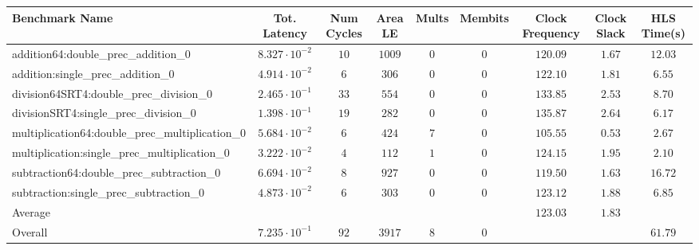 \begin{tabular}{|l|c|c|c|c|c|c|c|c|}
\hline
Benchmark Name                                   & Tot. Latency            & Num Cycles & Area LE  & Mults & Membits & Clock Frequency & Clock Slack & HLS Time(s) \\
\hline
addition64:double\_prec\_addition\_0             & $ 8.327 \cdot 10^{-2} $ & $ 10     $ & $ 1009 $ & $ 0 $ & $ 0   $ & $ 120.09      $ & $ 1.67    $ & $ 12.03   $ \\
addition:single\_prec\_addition\_0               & $ 4.914 \cdot 10^{-2} $ & $ 6      $ & $ 306  $ & $ 0 $ & $ 0   $ & $ 122.10      $ & $ 1.81    $ & $ 6.55    $ \\
division64SRT4:double\_prec\_division\_0         & $ 2.465 \cdot 10^{-1} $ & $ 33     $ & $ 554  $ & $ 0 $ & $ 0   $ & $ 133.85      $ & $ 2.53    $ & $ 8.70    $ \\
divisionSRT4:single\_prec\_division\_0           & $ 1.398 \cdot 10^{-1} $ & $ 19     $ & $ 282  $ & $ 0 $ & $ 0   $ & $ 135.87      $ & $ 2.64    $ & $ 6.17    $ \\
multiplication64:double\_prec\_multiplication\_0 & $ 5.684 \cdot 10^{-2} $ & $ 6      $ & $ 424  $ & $ 7 $ & $ 0   $ & $ 105.55      $ & $ 0.53    $ & $ 2.67    $ \\
multiplication:single\_prec\_multiplication\_0   & $ 3.222 \cdot 10^{-2} $ & $ 4      $ & $ 112  $ & $ 1 $ & $ 0   $ & $ 124.15      $ & $ 1.95    $ & $ 2.10    $ \\
subtraction64:double\_prec\_subtraction\_0       & $ 6.694 \cdot 10^{-2} $ & $ 8      $ & $ 927  $ & $ 0 $ & $ 0   $ & $ 119.50      $ & $ 1.63    $ & $ 16.72   $ \\
subtraction:single\_prec\_subtraction\_0         & $ 4.873 \cdot 10^{-2} $ & $ 6      $ & $ 303  $ & $ 0 $ & $ 0   $ & $ 123.12      $ & $ 1.88    $ & $ 6.85    $ \\
\hline
Average                                          & $                     $ & $        $ & $      $ & $   $ & $     $ & $ 123.03      $ & $ 1.83    $ & $         $ \\
\hline
Overall                                          & $ 7.235 \cdot 10^{-1} $ & $ 92     $ & $ 3917 $ & $ 8 $ & $ 0   $ & $             $ & $         $ & $ 61.79   $ \\
\hline
\end{tabular}

